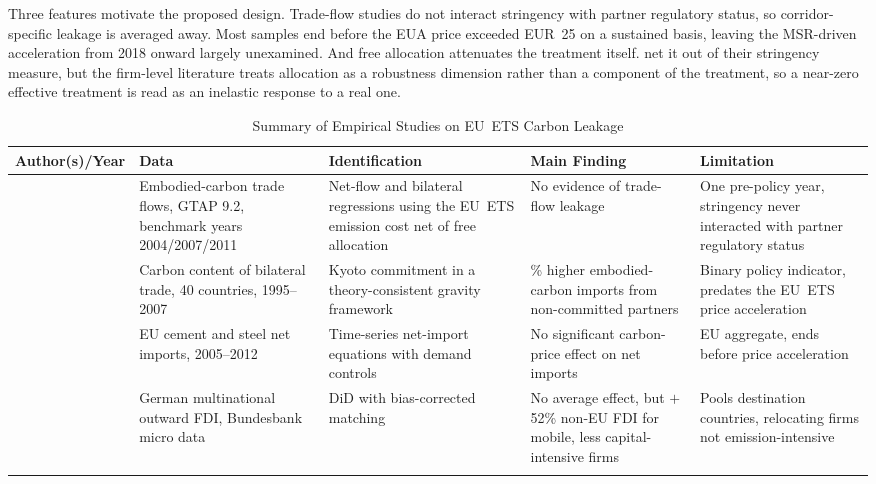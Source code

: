 Three features motivate the proposed design. Trade-flow studies do not interact stringency with partner regulatory status, so corridor-specific leakage is averaged away. Most samples end before the EUA price exceeded EUR~25 on a sustained basis, leaving the MSR-driven acceleration from 2018 onward largely unexamined. And free allocation attenuates the treatment itself. \citet{naegele2019} net it out of their stringency measure, but the firm-level literature treats allocation as a robustness dimension rather than a component of the treatment, so a near-zero effective treatment is read as an inelastic response to a real one.

\begin{table}[htbp]
\centering
\caption[Summary of empirical studies on EU~ETS carbon leakage]{Summary of Empirical Studies on EU~ETS Carbon Leakage}
\label{tab:literature}
\small
\renewcommand{\arraystretch}{1.3}
\begin{tabularx}{\textwidth}{>{\raggedright\arraybackslash}p{2.8cm} >{\raggedright\arraybackslash}p{2.5cm} >{\raggedright\arraybackslash}p{3.2cm} >{\raggedright\arraybackslash}p{2.8cm} >{\raggedright\arraybackslash}X}
\toprule
Author(s)/Year & Data & Identification & Main Finding & Limitation \\
\midrule
\citet{naegele2019} & Embodied-carbon trade flows, GTAP 9.2, benchmark years 2004/2007/2011 & Net-flow and bilateral regressions using the EU~ETS emission cost net of free allocation & No evidence of trade-flow leakage & One pre-policy year, stringency never interacted with partner regulatory status \\
\addlinespace
\citet{aichele2015} & Carbon content of bilateral trade, 40 countries, 1995--2007 & Kyoto commitment in a theory-consistent gravity framework & 8\% higher embodied-carbon imports from non-committed partners & Binary policy indicator, predates the EU~ETS price acceleration \\
\addlinespace
\citet{branger2016} & EU cement and steel net imports, 2005--2012 & Time-series net-import equations with demand controls & No significant carbon-price effect on net imports & EU aggregate, ends before price acceleration \\
\addlinespace
\citet{koch2019} & German multinational outward FDI, Bundesbank micro data & DiD with bias-corrected matching & No average effect, but $+$52\% non-EU FDI for mobile, less capital-intensive firms & Pools destination countries, relocating firms not emission-intensive \\
\addlinespace

\end{tabularx}
\end{table}
